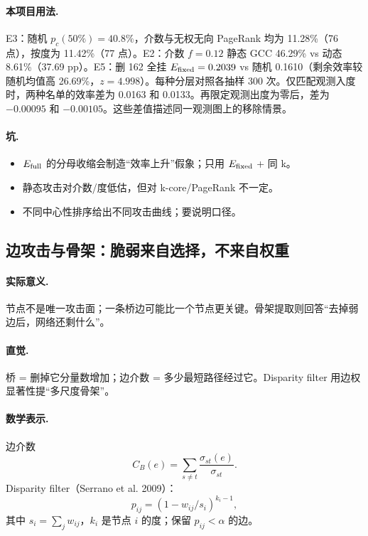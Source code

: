 \paragraph{本项目用法.}
\unit{E3}：随机 \(p_c(50\%)=40.8\%\)，介数与无权无向 PageRank 均为 11.28\%（76 点），按度为 11.42\%（77 点）。\unit{E2}：介数 \(f=0.12\) 静态 GCC 46.29\% vs 动态 8.61\%（37.69 pp）。\unit{E5}：删 162 全挂 \(E_{\mathrm{fixed}}=0.2039\) vs 随机 0.1610（剩余效率较随机均值高 26.69\%，\(z=4.998\)）。每种分层对照各抽样 300 次。仅匹配观测入度时，两种名单的效率差为 0.0163 和 0.0133。再限定观测出度为零后，差为 \(-0.00095\) 和 \(-0.00105\)。这些差值描述同一观测图上的移除情景。

\paragraph{坑.}
\begin{itemize}
  \item \(E_{\mathrm{full}}\) 的分母收缩会制造“效率上升”假象；只用 \(E_{\mathrm{fixed}}\) + 同 k。
  \item 静态攻击对介数/度低估，但对 k-core/PageRank 不一定。
  \item 不同中心性排序给出不同攻击曲线；要说明口径。
\end{itemize}

\subsection{边攻击与骨架：脆弱来自选择，不来自权重}

\paragraph{实际意义.}
节点不是唯一攻击面；一条桥边可能比一个节点更关键。骨架提取则回答“去掉弱边后，网络还剩什么”。

\paragraph{直觉.}
桥 = 删掉它分量数增加；边介数 = 多少最短路径经过它。Disparity filter 用边权显著性提“多尺度骨架”。

\paragraph{数学表示.}
边介数
\[
C_B(e)=\sum_{s\ne t}\frac{\sigma_{st}(e)}{\sigma_{st}}.
\]
Disparity filter（Serrano et al. 2009）：
\[
p_{ij}=(1-w_{ij}/s_i)^{k_i-1},
\]
其中 \(s_i=\sum_j w_{ij}\)，\(k_i\) 是节点 \(i\) 的度；保留 \(p_{ij}<\alpha\) 的边。


